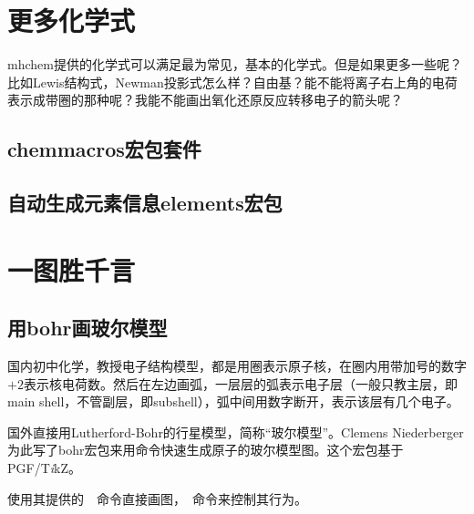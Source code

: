 \documentclass[a4paper,UTF8,zihao = -4]{ctexart} %
\providecommand{\tikzlg}{PGF/T\textit{i}kZ}
\begin{document}
\section{更多化学式}
\label{sec:advanced}

\textsf{mhchem}提供的化学式可以满足最为常见，基本的化学式。但是如果更多一些呢？比如Lewis结构式，Newman投影式怎么样？自由基？能不能将离子右上角的电荷表示成带圈的那种呢？我能不能画出氧化还原反应转移电子的箭头呢？

\subsection{\textsf{chemmacros}宏包套件}
\label{sec:moreSymbEq}

\subsection{自动生成元素信息\textsf{elements}宏包}
\label{sec:elements}


\section{一图胜千言}
\label{sec:graphSketch}




\subsection{用\textsf{bohr}画玻尔模型}
\label{sec:bohr}

国内初中化学，教授电子结构模型，都是用圈表示原子核，在圈内用带加号的数字$+2$表示核电荷数。然后在左边画弧，一层层的弧表示电子层（一般只教主层，即main shell，不管副层，即subshell），弧中间用数字断开，表示该层有几个电子。

国外直接用Lutherford-Bohr的行星模型，简称“玻尔模型”。Clemens Niederberger为此写了\textsf{bohr}宏包来用命令快速生成原子的玻尔模型图。这个宏包基于\tikzlg{}。

\begin{dispListing}
\usepackage{bohr}
\end{dispListing}

使用其提供的~~命令直接画图，~命令来控制其行为。

\begin{dispExample}
\end{dispExample}
\end{document}
